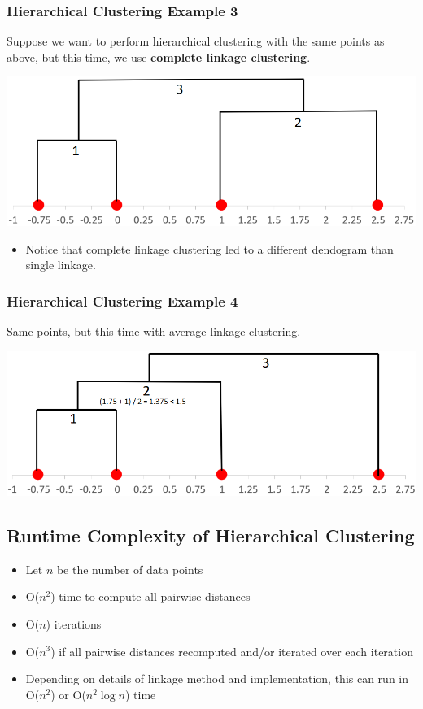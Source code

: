 \documentclass[10pt]{article}
\begin{document}
\subsubsection*{Hierarchical Clustering Example 3}
Suppose we want to perform hierarchical clustering with the same points as above, but this time, we use \textbf{complete linkage clustering}.
\begin{center}
    \includegraphics[width=\textwidth]{W6_14.png}
\end{center}
\begin{itemize}
    \item Notice that complete linkage clustering led to a different dendogram than single linkage.
\end{itemize}

\subsubsection*{Hierarchical Clustering Example 4}
Same points, but this time with average linkage clustering.
\begin{center}
    \includegraphics[width=\textwidth]{W6_15.png}
\end{center}

\subsection*{Runtime Complexity of Hierarchical Clustering}
\begin{itemize}
    \item Let $n$ be the number of data points
    \item O($n^2$) time to compute all pairwise distances
    \item O($n$) iterations
    \item O($n^3$) if all pairwise distances recomputed and/or iterated over each iteration
    \item Depending on details of linkage method and implementation, this can run in O($n^2$) or O($n^2 \log n$) time
\end{itemize}
\end{document}
